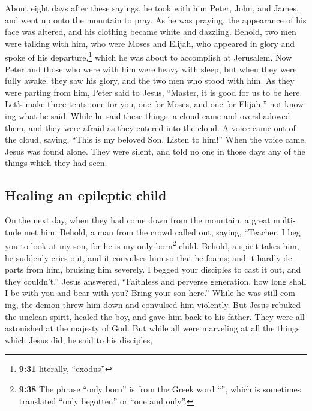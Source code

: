\begin{paracol}{2}
\begin{otherlanguage}{english}
 About eight days after these sayings, he took with him
Peter, John, and James, and went up onto the mountain to pray.
 As he was praying, the appearance of his face was
altered, and his clothing became white and dazzling. 
Behold, two men were talking with him, who were Moses and Elijah,
 who appeared in glory and spoke of his
departure,\footnote{\textbf{9:31} literally, ``exodus''} which he was
about to accomplish at Jerusalem.  Now Peter and those
who were with him were heavy with sleep, but when they were fully awake,
they saw his glory, and the two men who stood with him. 
As they were parting from him, Peter said to Jesus, ``Master, it is good
for us to be here. Let's make three tents: one for you, one for Moses,
and one for Elijah,'' not knowing what he said.  While he
said these things, a cloud came and overshadowed them, and they were
afraid as they entered into the cloud.  A voice came out
of the cloud, saying, ``This is my beloved Son. Listen to him!''
 When the voice came, Jesus was found alone. They were
silent, and told no one in those days any of the things which they had
seen.

\hypertarget{healing-an-epileptic-child}{%
\subsection{Healing an epileptic
child}\label{healing-an-epileptic-child}}

 On the next day, when they had come down from the
mountain, a great multitude met him.  Behold, a man from
the crowd called out, saying, ``Teacher, I beg you to look at my son,
for he is my only born\footnote{\textbf{9:38} The phrase ``only born''
  is from the Greek word ``'', which is sometimes
  translated ``only begotten'' or ``one and only''.} child.
 Behold, a spirit takes him, he suddenly cries out, and
it convulses him so that he foams; and it hardly departs from him,
bruising him severely.  I begged your disciples to cast
it out, and they couldn't.''  Jesus answered, ``Faithless
and perverse generation, how long shall I be with you and bear with you?
Bring your son here.''  While he was still coming, the
demon threw him down and convulsed him violently. But Jesus rebuked the
unclean spirit, healed the boy, and gave him back to his father.
 They were all astonished at the majesty of God. But
while all were marveling at all the things which Jesus did, he said to
his disciples,


\end{otherlanguage}
\end{paracol}
